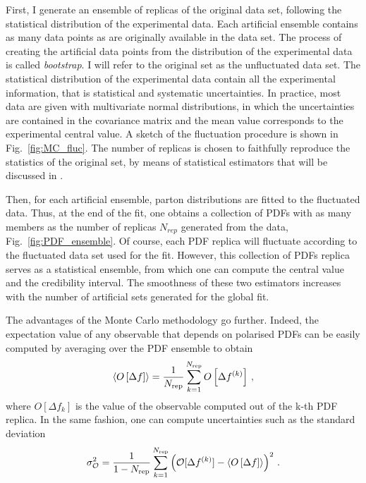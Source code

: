First, I generate an ensemble of replicas of the original data set, following the statistical distribution of the experimental data. Each artificial ensemble contains as many data points as are originally available in the data set. The process of creating the artificial data points from the distribution of the experimental data is called \textit{bootstrap}. I will refer to the original set as the unfluctuated data set. The statistical distribution of the experimental data contain all the experimental information, that is statistical and systematic uncertainties. In practice, most data are given with multivariate normal distributions, in which the uncertainties are contained in the covariance matrix and the mean value corresponds to the experimental central value. A sketch of the fluctuation procedure is shown in Fig.~\ref{fig:MC_fluc}. The number of replicas is chosen to faithfully reproduce the statistics of the original set, by means of statistical estimators that will be discussed in .%

Then, for each artificial ensemble, parton distributions are fitted to the fluctuated data. Thus, at the end of the fit, one obtains a collection of PDFs with as many members as the number of replicas $N_{rep}$ generated from the data, Fig.~\ref{fig:PDF_ensemble}. Of course, each PDF replica will fluctuate according to the fluctuated data set used for the fit. However, this collection of PDFs replica serves as a statistical ensemble, from which one can compute the central value and the credibility interval. The smoothness of these two estimators increases with the number of artificial sets generated for the global fit.%
 
The advantages of the Monte Carlo methodology go further. Indeed, the expectation value of any observable that depends on polarised PDFs can be easily computed by averaging over the PDF ensemble to obtain
\begin{equation}
  \left< O\left[ \Delta f \right] \right> = \frac{1}{N_{\textrm{rep}}} \sum_{k=1}^{N_{\textrm{rep}}} O\left[\Delta f^{(k)}\right] \,,
\end{equation}
where $O\left[\Delta f_k\right]$ is the value of the observable computed out of the k-th PDF replica. In the same fashion, one can compute uncertainties such as the standard deviation
\begin{equation}
  \sigma_{\mathcal{O}}^2 = \frac{1}{1 - N_{\textrm{rep}}} \sum_{k=1}^{N_{\textrm{rep}}} \left( \mathcal{O}[\Delta f^{(k)}] - \left< O\left[ \Delta f \right] \right> \right)^2 \,.
\end{equation}
